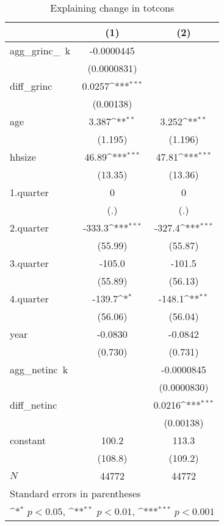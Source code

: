 \begin{table}[htbp]\centering
\def\sym#1{\ifmmode^{#1}\else\(^{#1}\)\fi}
\caption{\label{totcons\_deltainc} Explaining change in totcons}
\begin{tabular}{l*{2}{c}}
\hline\hline
            &\multicolumn{1}{c}{(1)}         &\multicolumn{1}{c}{(2)}         \\
\hline
agg\_grinc\_~k&  -0.0000445         &                     \\
            & (0.0000831)         &                     \\
diff\_grinc  &      0.0257\sym{***}&                     \\
            &   (0.00138)         &                     \\
age         &       3.387\sym{**} &       3.252\sym{**} \\
            &     (1.195)         &     (1.196)         \\
hhsize      &       46.89\sym{***}&       47.81\sym{***}\\
            &     (13.35)         &     (13.36)         \\
1.quarter   &           0         &           0         \\
            &         (.)         &         (.)         \\
2.quarter   &      -333.3\sym{***}&      -327.4\sym{***}\\
            &     (55.99)         &     (55.87)         \\
3.quarter   &      -105.0         &      -101.5         \\
            &     (55.89)         &     (56.13)         \\
4.quarter   &      -139.7\sym{*}  &      -148.1\sym{**} \\
            &     (56.06)         &     (56.04)         \\
year        &     -0.0830         &     -0.0842         \\
            &     (0.730)         &     (0.731)         \\
agg\_netinc~k&                     &  -0.0000845         \\
            &                     & (0.0000830)         \\
diff\_netinc &                     &      0.0216\sym{***}\\
            &                     &   (0.00138)         \\
constant    &       100.2         &       113.3         \\
            &     (108.8)         &     (109.2)         \\
\hline
\(N\)       &       44772         &       44772         \\
\hline\hline
\multicolumn{3}{l}{\footnotesize Standard errors in parentheses}\\
\multicolumn{3}{l}{\footnotesize \sym{*} \(p<0.05\), \sym{**} \(p<0.01\), \sym{***} \(p<0.001\)}\\
\end{tabular}
\end{table}
